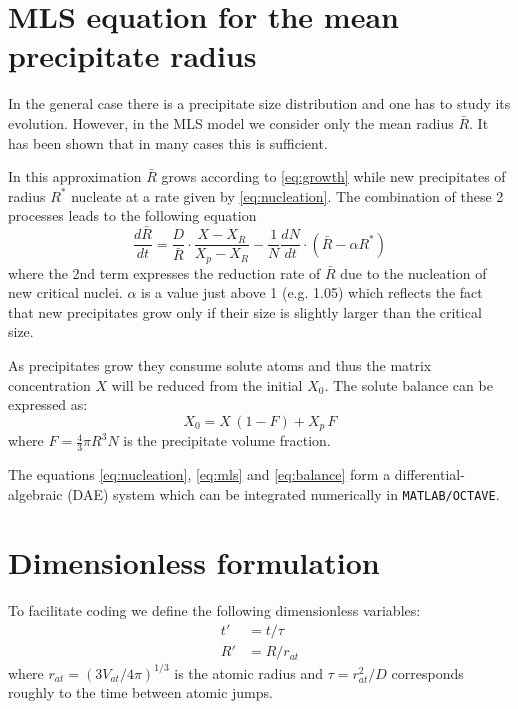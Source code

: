 \documentclass[12pt,a4paper]{article}
\begin{document}
\section{MLS equation for the mean precipitate radius}

In the general case there is a precipitate size distribution and one has to study its evolution. However, in the MLS model we consider only the mean radius $\bar{R}$. It has been shown that in many cases this is sufficient.

In this approximation $\bar{R}$ grows according to \eqref{eq:growth} while new precipitates of radius $R^*$ nucleate at a rate given by \eqref{eq:nucleation}. The combination of these 2 processes leads to the following equation 
\begin{equation}
\label{eq:mls}
\frac{d\bar{R}}{dt} = \frac{D}{\bar{R}} \cdot \frac{X - X_R}{X_p - X_R} - \frac{1}{N}\frac{dN}{dt} \cdot (\bar{R} - \alpha R^*)
\end{equation}
where the 2nd term expresses the reduction rate of $\bar{R}$ due to the nucleation of new critical nuclei. $\alpha$ is a value just above 1 (e.g. 1.05) which reflects the fact that new precipitates grow only if their size is slightly larger than the critical size.

As precipitates grow they consume solute atoms and thus the matrix concentration $X$ will be reduced from the initial $X_0$. The solute balance can be expressed as:
\begin{equation}
\label{eq:balance}
X_0 = X\,(1-F) + X_p\,F
\end{equation}
where $F=\frac{4}{3}\pi R^3 N$ is the precipitate volume fraction.

The equations \eqref{eq:nucleation}, \eqref{eq:mls} and \eqref{eq:balance} form a differential-algebraic (DAE) system which can be integrated numerically in \texttt{MATLAB/OCTAVE}. 

\section{Dimensionless formulation}
To facilitate coding we define the following dimensionless variables:
\begin{subequations}
	\label{eq:dmls}
	\begin{align}
t' &= t / \tau \\
R' &= R / r_{at}
	\end{align}
\end{subequations}
where $r_{at} = (3V_{at}/4\pi)^{1/3}$ is the atomic radius and $\tau = r_{at}^2/D$ corresponds roughly to the time between atomic jumps.
\end{document}
